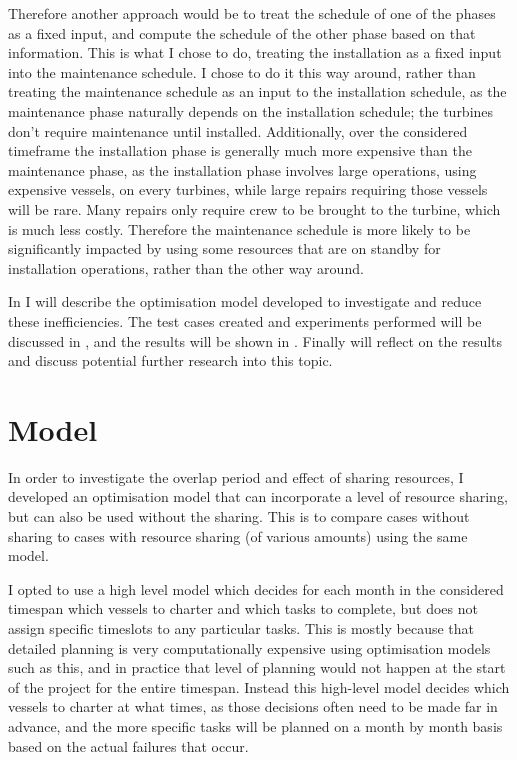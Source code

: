 \documentclass[a4paper,12pt]{report}
\begin{document}
Therefore another approach would be to treat the schedule of one of the phases as a fixed input, and compute the schedule of the other phase based on that information. This is what I chose to do, treating the installation as a fixed input into the maintenance schedule. I chose to do it this way around, rather than treating the maintenance schedule as an input to the installation schedule, as the maintenance phase naturally depends on the installation schedule; the turbines don't require maintenance until installed. Additionally, over the considered timeframe the installation phase is generally much more expensive than the maintenance phase, as the installation phase involves large operations, using expensive vessels, on every turbines, while large repairs requiring those vessels will be rare. Many repairs only require crew to be brought to the turbine, which is much less costly. Therefore the maintenance schedule is more likely to be significantly impacted by using some resources that are on standby for installation operations, rather than the other way around. 

\bigskip

In  I will describe the optimisation model developed to investigate and reduce these inefficiencies. The test cases created and experiments performed will be discussed in , and the results will be shown in . Finally  will reflect on the results and discuss potential further research into this topic. 

\section{Model} \label{s:model}
In order to investigate the overlap period and effect of sharing resources, I developed an optimisation model that can incorporate a level of resource sharing, but can also be used without the sharing. This is to compare cases without sharing to cases with resource sharing (of various amounts) using the same model. 

I opted to use a high level model which decides for each month in the considered timespan which vessels to charter and which tasks to complete, but does not assign specific timeslots to any particular tasks. This is mostly because that detailed planning is very computationally expensive using optimisation models such as this, and in practice that level of planning would not happen at the start of the project for the entire timespan. Instead this high-level model decides which vessels to charter at what times, as those decisions often need to be made far in advance, and the more specific tasks will be planned on a month by month basis based on the actual failures that occur. 
\end{document}
